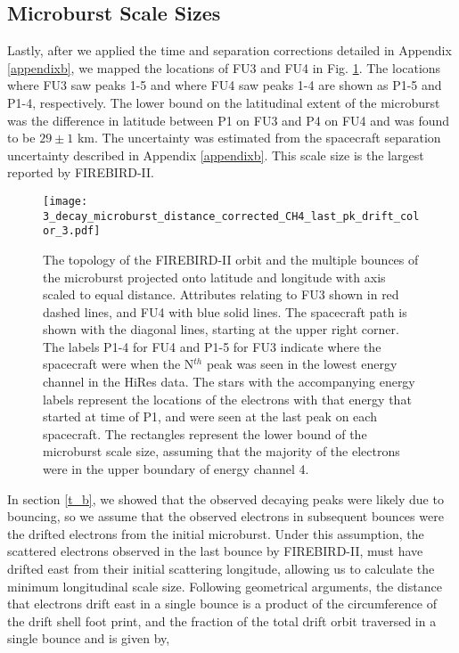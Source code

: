 \subsection{Microburst Scale Sizes} \label{scale_size} %
Lastly, after we applied the time and separation corrections detailed in Appendix \ref{appendixb}, we mapped the locations of FU3 and FU4 in Fig. \ref{map_plot}. The locations where FU3 saw peaks 1-5 and where FU4 saw peaks 1-4 are shown as P1-5 and P1-4, respectively. The lower bound on the latitudinal extent of the microburst was the difference in latitude between P1 on FU3 and P4 on FU4 and was found to be $29 \pm 1$ km. The uncertainty was estimated from the spacecraft separation uncertainty described in Appendix \ref{appendixb}. This scale size is the largest reported by FIREBIRD-II.

\begin{figure}
\texttt{[image: 3\_decay\_microburst\_distance\_corrected\_CH4\_last\_pk\_drift\_color\_3.pdf]}
\caption{The topology of the FIREBIRD-II orbit and the multiple bounces of the microburst projected onto latitude and longitude with axis scaled to equal distance. Attributes relating to FU3 shown in red dashed lines, and FU4 with blue solid lines. The spacecraft path is shown with the diagonal lines, starting at the upper right corner. The labels P1-4 for FU4 and P1-5 for FU3 indicate where the spacecraft were when the N$^{th}$ peak was seen in the lowest energy channel in the HiRes data. The stars with the accompanying energy labels represent the locations of the electrons with that energy that started at time of P1, and were seen at the last peak on each spacecraft. The rectangles represent the lower bound of the microburst scale size, assuming that the majority of the electrons were in the upper boundary of energy channel 4.}
\label{map_plot}
\end{figure}

In section \ref{t_b}, we showed that the observed decaying peaks were likely due to bouncing, so we assume that the observed electrons in subsequent bounces were the drifted electrons from the initial microburst. Under this assumption, the scattered electrons observed in the last bounce by FIREBIRD-II, must have drifted east from their initial scattering longitude, allowing us to calculate the minimum longitudinal scale size. Following geometrical arguments, the distance that electrons drift east in a single bounce is a product of the circumference of the drift shell foot print, and the fraction of the total drift orbit traversed in a single bounce and is given by, 

